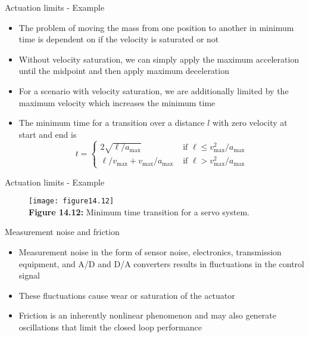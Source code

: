 \documentclass{beamer-control}
\begin{document}
\begin{frame}{Actuation limits - Example}
	\begin{itemize}
		\item The problem of moving the mass from one position to another in minimum time is dependent on if the velocity is saturated or not
		\item Without velocity saturation, we can simply apply the maximum acceleration until the midpoint and then apply maximum deceleration
		\item For a scenario with velocity saturation, we are additionally limited by the maximum velocity which increases the minimum time
		\item The minimum time for a transition over a distance $l$ with zero velocity at start and end is
		\[t= \begin{cases}2 \sqrt{\ell / a_{\max }} & \text { if } \ell \leq v_{\max }^2 / a_{\max } \\ \ell / v_{\max }+v_{\max } / a_{\max } & \text { if } \ell>v_{\max }^2 / a_{\max }\end{cases}\]
	\end{itemize}

\end{frame} 

\begin{frame}{Actuation limits - Example}
\begin{figure}
	\vspace{-0.5cm}
	\centering
	\texttt{[image: figure14.12]}\\
	\vspace{-0.2cm}
	\textbf{Figure 14.12:} Minimum time transition for a servo system.
\end{figure}
\end{frame}

\begin{frame}{Measurement noise and friction}
\begin{itemize}
\item Measurement noise in the form of sensor noise, electronics, transmission equipment, and A/D and D/A converters results in fluctuations in the control signal
\item These fluctuations cause wear or saturation of the actuator
\item Friction is an inherently nonlinear phenomenon and may also generate oscillations that limit the closed loop performance
\end{itemize}
\end{frame}
\end{document}
